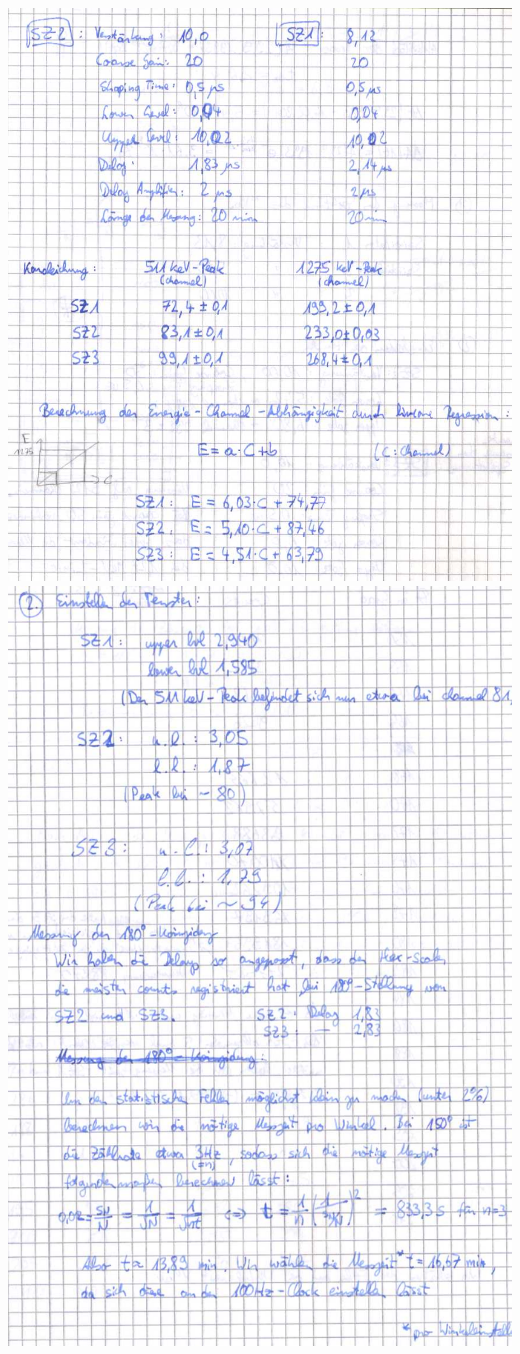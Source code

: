\includegraphics[scale=0.55]{Messprotokoll/0002.jpeg}
\clearpage
\includegraphics[scale=0.55]{Messprotokoll/0003.jpeg}

